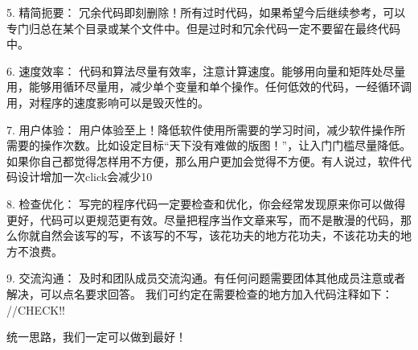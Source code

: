 5.	精简扼要：
冗余代码即刻删除！所有过时代码，如果希望今后继续参考，可以专门归总在某个目录或某个文件中。但是过时和冗余代码一定不要留在最终代码中。

6.	速度效率：
代码和算法尽量有效率，注意计算速度。能够用向量和矩阵处尽量用，能够用循环尽量用，减少单个变量和单个操作。任何低效的代码，一经循环调用，对程序的速度影响可以是毁灭性的。

7.	用户体验：
用户体验至上！降低软件使用所需要的学习时间，减少软件操作所需要的操作次数。比如设定目标“天下没有难做的版图！”，让入门门槛尽量降低。如果你自己都觉得怎样用不方便，那么用户更加会觉得不方便。有人说过，软件代码设计增加一次click会减少10%

8.	检查优化：
写完的程序代码一定要检查和优化，你会经常发现原来你可以做得更好，代码可以更规范更有效。尽量把程序当作文章来写，而不是散漫的代码，那么你就自然会该写的写，不该写的不写，该花功夫的地方花功夫，不该花功夫的地方不浪费。

9.	交流沟通：
及时和团队成员交流沟通。有任何问题需要团体其他成员注意或者解决，可以点名要求回答。
我们可约定在需要检查的地方加入代码注释如下：        //CHECK!!

统一思路，我们一定可以做到最好！

